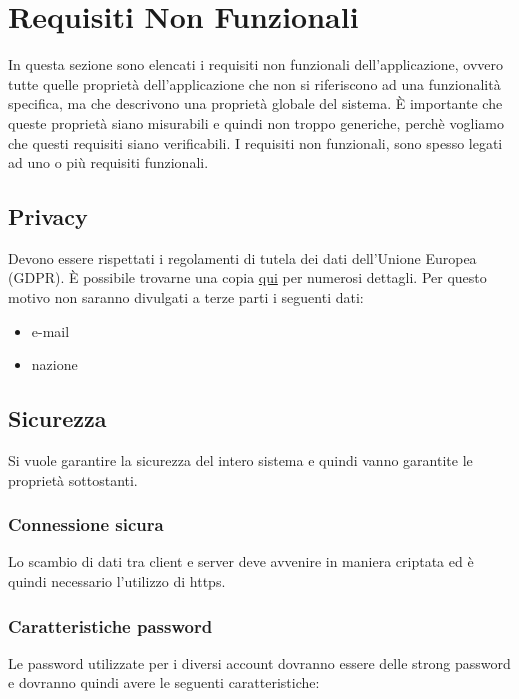\section{Requisiti Non Funzionali}
In questa sezione sono elencati i requisiti non funzionali dell'applicazione, ovvero tutte quelle proprietà dell'applicazione che non si riferiscono ad una funzionalità specifica, ma che descrivono una proprietà globale del sistema. È importante che queste proprietà siano misurabili e quindi non troppo generiche, perchè vogliamo che questi requisiti siano verificabili. I requisiti non funzionali, sono spesso legati ad uno o più requisiti funzionali.

\subsection{Privacy}
Devono essere rispettati i regolamenti di tutela dei dati dell'Unione Europea (GDPR). È possibile trovarne una copia \href{https://eur-lex.europa.eu/legal-content/EN/TXT/PDF/?uri=CELEX:32016R0679}{qui} per numerosi dettagli. Per questo motivo non saranno divulgati a terze parti i seguenti dati:
\begin{itemize}
    \item e-mail
    \item nazione
\end{itemize}

\subsection{Sicurezza}
Si vuole garantire la sicurezza del intero sistema e quindi vanno garantite le proprietà sottostanti.

\subsubsection{Connessione sicura}
Lo scambio di dati tra client e server deve avvenire in maniera criptata ed è quindi necessario l'utilizzo di https.

\subsubsection{Caratteristiche password}
Le password utilizzate per i diversi account dovranno essere delle strong password e dovranno quindi avere le seguenti caratteristiche: 

